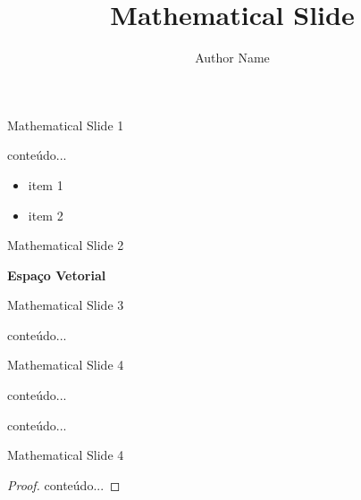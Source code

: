 \documentclass[12pt]{beamer}
\title{Mathematical Slide}
\author{Author Name}
\institute{Your Company or Institute}
\begin{document}
	\begin{frame}[plain]
		\maketitle
	\end{frame}

	
	\begin{frame}{Mathematical Slide 1}

		\begin{example}		
			conteúdo...
		\end{example}
		
		
		
		\begin{itemize}
			\item item 1
			\item item 2
		\end{itemize}
		
	\end{frame}

	\begin{frame}{Mathematical Slide 2}
		\begin{definition}{\textbf{Espaço Vetorial}}

		\end{definition}
	\end{frame}

	\begin{frame}{Mathematical Slide 3}
		\begin{theorem}
			conteúdo...
		\end{theorem}
	\end{frame}

	\begin{frame}{Mathematical Slide 4}
		\begin{Lemma}
			conteúdo...
		\end{Lemma}
	
		\begin{corollary}
			conteúdo...
		\end{corollary}
	\end{frame}

	\begin{frame}{Mathematical Slide 4}
		\begin{proof}
			conteúdo...
		\end{proof}
	\end{frame}
\end{document}
